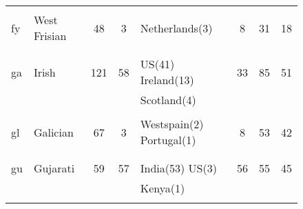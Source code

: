 \begin{figure}[h]
\begin{tabular}{llcclccc}
&&&&&&&\\
fy&West Frisian&48&3&Netherlands(3) &8&31&18\\
&&&&&&&\\
&&&&&&&\\
ga&Irish&121&58&US(41) Ireland(13) &33&85&51\\
&&&&Scotland(4) &&&\\
&&&&&&&\\
gl&Galician&67&3&Westspain(2) Portugal(1) &8&53&42\\
&&&&&&&\\
&&&&&&&\\
gu&Gujarati&59&57&India(53) US(3) &56&55&45\\
&&&&Kenya(1) &&&\\
&&&&&&&\\
\end{tabular}
\end{figure}
\clearpage
